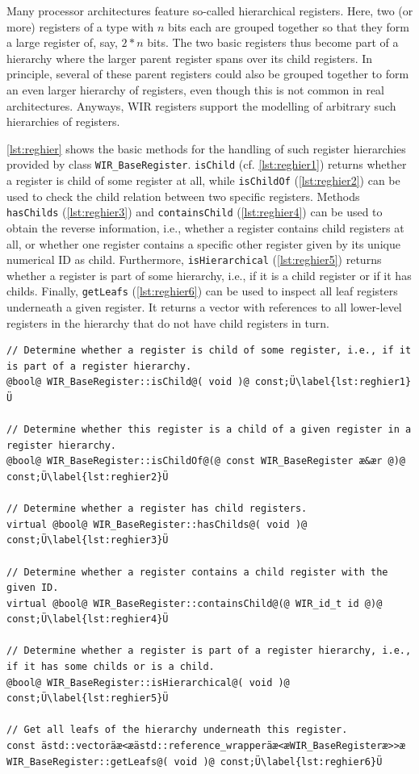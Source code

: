 Many processor architectures feature so-called hierarchical registers.
Here, two (or more) registers of a type with $n$ bits each are grouped together so that they form a large register of, say, $2 \ast n$ bits.
The two basic registers thus become part of a hierarchy where the larger parent register spans over its child registers.
In principle, several of these parent registers could also be grouped together to form an even larger hierarchy of registers, even though this is not common in real architectures.
Anyways, \gls{WIR} registers support the modelling of arbitrary such hierarchies of registers.

\cref{lst:reghier} shows the basic methods for the handling of such register hierarchies provided by class \texttt{WIR\_Base\-Register}.
\texttt{isChild} (cf. \cref{lst:reghier1}) returns whether a register is child of some register at all, while \texttt{isChildOf} (\cref{lst:reghier2}) can be used to check the child relation between two specific registers.
Methods \texttt{hasChilds} (\cref{lst:reghier3}) and \texttt{containsChild} (\cref{lst:reghier4}) can be used to obtain the reverse information, i.e., whether a register contains child registers at all, or whether one register contains a specific other register given by its unique numerical ID as child.
Furthermore, \texttt{isHierarchical} (\cref{lst:reghier5}) returns whether a register is part of some hierarchy, i.e., if it is a child register or if it has childs.
Finally, \texttt{getLeafs} (\cref{lst:reghier6}) can be used to inspect all leaf registers underneath a given register.
It returns a vector with references to all lower-level registers in the hierarchy that do not have child registers in turn.

\begin{lstlisting}[style=code,float=t,caption={Register Hierarchy Handling of Class \texttt{WIR\_BaseRegister}},label=lst:reghier]
// Determine whether a register is child of some register, i.e., if it is part of a register hierarchy.
@bool@ WIR_BaseRegister::isChild@( void )@ const;Ü\label{lst:reghier1}Ü

// Determine whether this register is a child of a given register in a register hierarchy.
@bool@ WIR_BaseRegister::isChildOf@(@ const WIR_BaseRegister æ&ær @)@ const;Ü\label{lst:reghier2}Ü

// Determine whether a register has child registers.
virtual @bool@ WIR_BaseRegister::hasChilds@( void )@ const;Ü\label{lst:reghier3}Ü

// Determine whether a register contains a child register with the given ID.
virtual @bool@ WIR_BaseRegister::containsChild@(@ WIR_id_t id @)@ const;Ü\label{lst:reghier4}Ü

// Determine whether a register is part of a register hierarchy, i.e., if it has some childs or is a child.
@bool@ WIR_BaseRegister::isHierarchical@( void )@ const;Ü\label{lst:reghier5}Ü

// Get all leafs of the hierarchy underneath this register.
const ästd::vectoräæ<æästd::reference_wrapperäæ<æWIR_BaseRegisteræ>>æ WIR_BaseRegister::getLeafs@( void )@ const;Ü\label{lst:reghier6}Ü
\end{lstlisting}

